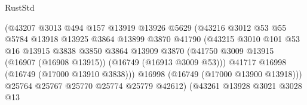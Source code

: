 \begin{lexlean}{RustStd}
\begin{coremodule}
                                        (@43207
                                          @3013
                                          @494
                                          @157
                                          @13919
                                          @13926
                                          @5629
                                          (@43216
                                            @3012
                                            @53
                                            @55
                                            @5784
                                            @13918
                                            @13925
                                            @3864
                                            @13899
                                            @3870
                                            @41790
                                            (@43215
                                              @3010
                                              @101
                                              @53
                                              @16
                                              @13915
                                              @3838
                                              @3850
                                              @3864
                                              @13909
                                              @3870
                                              (@41750
                                                @3009
                                                @13915
                                                (@16907 (@16908 @13915))
                                                (@16749 (@16913 @3009 @53)))
                                              @41717
                                              @16998
                                              (@16749 (@17000 @13910 @3838)))
                                            @16998
                                            (@16749 (@17000 @13900 @13918)))
                                          @25764
                                          @25767
                                          @25770
                                          @25774
                                          @25779
                                          @42612)
                                        (@43261
                                          @13928
                                          @3021
                                          @3028
                                          @13

\end{coremodule}
\end{lexlean}
